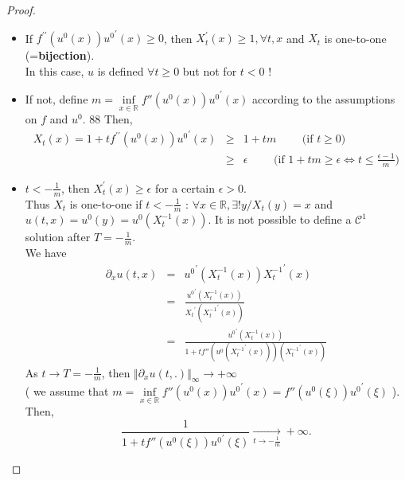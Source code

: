 \documentclass{report}
\theoremstyle{plain}
\theoremstyle{definition}
\theoremstyle{remark}
\begin{document}
\begin{proof}
    \begin{itemize}
    \item If $f^{\prime\prime}\left(u^0(x)\right) {u^0}^\prime(x) \ge 0$, then $X_t^\prime(x) \ge 1, \forall t,x$ and $X_t$ is one-to-one (=\textbf{bijection}). \\
    In this case, $u$ is defined $\forall t \ge 0 $ but not for $t < 0$ !
    \item If not, define $m = \inf\limits_{x\in\mathbb{R}} f''\left(u^0(x)\right) {u^0}^\prime(x)$ according to the assumptions on $f$ and $u^0$. 88
    Then, \begin{eqnarray*}
    X_t(x) = 1 + t f^{\prime\prime}\left(u^0(x)\right){u^0}^\prime(x) &\ge& 1 + tm \qquad \text{ (if $t \ge 0$)} \\
    &\ge& \epsilon \qquad\text{ (if $1 + tm \ge \epsilon \Leftrightarrow t \le \frac{\epsilon - 1}{m}$)}
    \end{eqnarray*}
    \item $t<-\frac{1}{m}$, then $X^\prime_t(x) \ge \epsilon$ for a certain $\epsilon > 0$. \\
    Thus $X_t$ is one-to-one if $t<-\frac{1}{m}$ : $\forall x \in \mathbb{R}, \exists ! y / X_t(y) = x$ and $u(t,x) = u^0(y) = u^0\left(X_t^{-1}(x)\right)$.
    It is not possible to define a $\mathcal{C}^1$ solution after $T = - \frac{1}{m}$. \\
    We have \begin{eqnarray*}
    \partial_x u(t,x) &=& {u^0}^\prime \left(X_t^{-1}(x)\right) {X_t^{-1}}^\prime(x) \\
    &=& \frac{{u^0}^\prime \left(X_t^{-1}(x)\right)}{{X_t}^\prime\left({X_t^{-1}}^\prime(x)\right)} \\
    &=& \frac{{u^0}^\prime \left(X_t^{-1}(x)\right)}{ 1 + t f''\left(u^0({X_t^{-1}}^\prime(x))\right)\left({X_t^{-1}}^\prime(x)\right)}
    \end{eqnarray*} As $t \rightarrow T = -\frac{1}{m}$, then $\Vert\partial_x u(t,.)\Vert_\infty \rightarrow +\infty$\\
    ( we assume that $m = \inf\limits_{x\in\mathbb{R}} f''\left(u^0(x)\right) {u^0}^\prime(x) = f''\left(u^0(\xi)\right) {u^0}^\prime(\xi)$ ). \\
    Then, \begin{equation*}
        \frac{1}{1 + tf''\left(u^0(\xi)\right) {u^0}^\prime(\xi)} \xrightarrow[t \rightarrow -\frac{1}{m}]{} +\infty.
    \end{equation*}
    \end{itemize}
    \end{proof}
\end{document}

